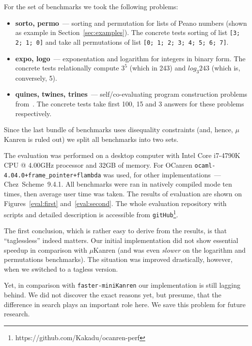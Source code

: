 For the set of benchmarks we took the following problems:

\begin{itemize}
\item \textbf{sorto, permo}~--- sorting and permutation for lists of Peano numbers (shown as example in Section~\ref{sec:examples}).
The concrete tests sorting of list \lstinline{[3; 2; 1; 0]} and take all permutations of list \lstinline{[0; 1; 2; 3; 4; 5; 6; 7]}.
\item \textbf{expo, logo}~--- exponentation and logarithm for integers in binary form. The concrete tests relationally compute
$3^5$ (which in 243) and $log_3 243$ (which is, conversely, 5).
\item \textbf{quines, twines, trines}~--- self/co-evaluating program construction problems from~\cite{Untagged}. The
concrete tests take first 100, 15 and 3 answers for these problems respectively.
\end{itemize}

Since the last bundle of benchmarks uses disequality constraints (and, hence, $\mu$Kanren is ruled out) we
split all benchmarks into two sets.

The evaluation was performed on a desktop computer with Intel Core i7-4790K CPU @ 4.00GHz processor and 32GB of memory.
For OCanren \mbox{\texttt{ocaml-4.04.0+frame_pointer+flambda}} was used, for other implementations~--- Chez~Scheme~9.4.1.
All benchmarks were ran in natively compiled mode ten times, then average user time was taken. The results of evaluation
are shown on Figures~\ref{eval:first} and~\ref{eval:second}. The whole evaluation repository with scripts and detailed
description is accessible from \lstinline{gitHub}\footnote{https://github.com/Kakadu/ocanren-perf}.

The first conclusion, which is rather easy to derive from the results, is that ``taglessless'' indeed matters. Our initial
implementation did not show essential speedup in comparison with $\mu$Kanren (and was even \emph{slower} on the logarithm
and permutations benchmarks). The situation was improved drastically, however, when we switched to a tagless version.

Yet, in comparison with \texttt{faster-miniKanren} our implementation is still lagging behind. We did not discover the exact
reasons yet, but presume, that the difference in search plays an important role here.
We save this problem for future research.
